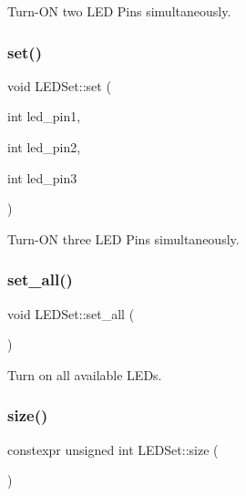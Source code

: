 Turn-\/\+ON two L\+ED Pins simultaneously. 

\mbox{\label{classLEDSet_ae2b77e5323305d3598c33e45e14c8cb4}} 
\subsubsection{\texorpdfstring{set()}{set()}\hspace{0.1cm}{\footnotesize\ttfamily [3/3]}}
{\footnotesize\ttfamily void L\+E\+D\+Set\+::set (\begin{DoxyParamCaption}\item[{int}]{led\+\_\+pin1,  }\item[{int}]{led\+\_\+pin2,  }\item[{int}]{led\+\_\+pin3 }\end{DoxyParamCaption})\hspace{0.3cm}{\ttfamily [inline]}}



Turn-\/\+ON three L\+ED Pins simultaneously. 

\mbox{\label{classLEDSet_a9d54d89134276744267b15d362debf44}} 
\subsubsection{\texorpdfstring{set\+\_\+all()}{set\_all()}}
{\footnotesize\ttfamily void L\+E\+D\+Set\+::set\+\_\+all (\begin{DoxyParamCaption}{ }\end{DoxyParamCaption})\hspace{0.3cm}{\ttfamily [inline]}}



Turn on all available L\+E\+Ds. 

\mbox{\label{classLEDSet_a21b51a375a8487fb89deaa2fbd3701df}} 
\subsubsection{\texorpdfstring{size()}{size()}}
{\footnotesize\ttfamily constexpr unsigned int L\+E\+D\+Set\+::size (\begin{DoxyParamCaption}{ }\end{DoxyParamCaption})\hspace{0.3cm}{\ttfamily [inline]}}



